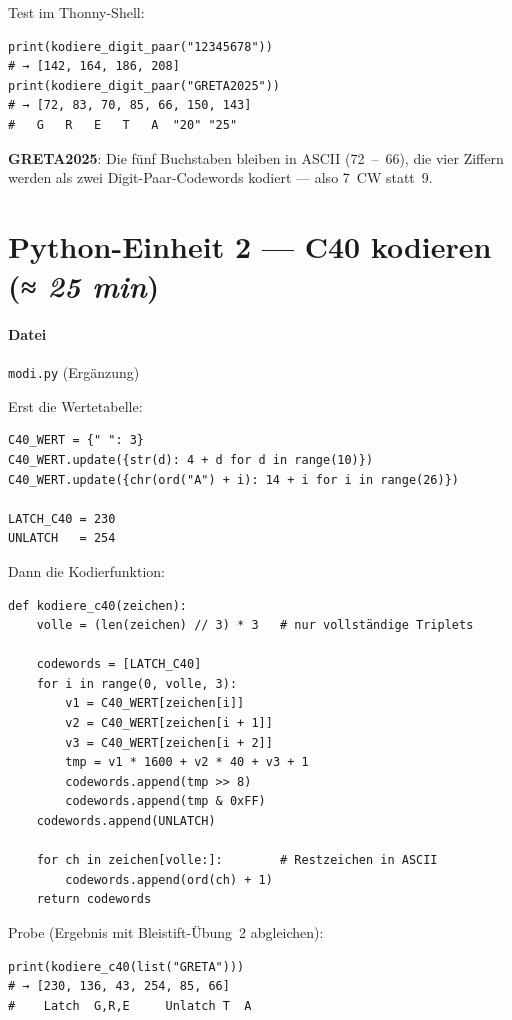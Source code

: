 Test im Thonny-Shell:

\begin{verbatim}
print(kodiere_digit_paar("12345678"))
# → [142, 164, 186, 208]
print(kodiere_digit_paar("GRETA2025"))
# → [72, 83, 70, 85, 66, 150, 143]
#   G   R   E   T   A  "20" "25"
\end{verbatim}

\textbf{GRETA2025}: Die fünf Buchstaben bleiben in ASCII (72~–~66),
die vier Ziffern werden als zwei Digit-Paar-Codewords kodiert — also
7~CW statt~9.

\section{Python-Einheit 2 — C40 kodieren \normalfont(\textit{≈ 25 min})}

\paragraph{Datei} \texttt{modi.py} (Ergänzung)

Erst die Wertetabelle:

\begin{verbatim}
C40_WERT = {" ": 3}
C40_WERT.update({str(d): 4 + d for d in range(10)})
C40_WERT.update({chr(ord("A") + i): 14 + i for i in range(26)})

LATCH_C40 = 230
UNLATCH   = 254
\end{verbatim}

Dann die Kodierfunktion:

\begin{verbatim}
def kodiere_c40(zeichen):
    volle = (len(zeichen) // 3) * 3   # nur vollständige Triplets

    codewords = [LATCH_C40]
    for i in range(0, volle, 3):
        v1 = C40_WERT[zeichen[i]]
        v2 = C40_WERT[zeichen[i + 1]]
        v3 = C40_WERT[zeichen[i + 2]]
        tmp = v1 * 1600 + v2 * 40 + v3 + 1
        codewords.append(tmp >> 8)
        codewords.append(tmp & 0xFF)
    codewords.append(UNLATCH)

    for ch in zeichen[volle:]:        # Restzeichen in ASCII
        codewords.append(ord(ch) + 1)
    return codewords
\end{verbatim}

Probe (Ergebnis mit Bleistift-Übung~2 abgleichen):

\begin{verbatim}
print(kodiere_c40(list("GRETA")))
# → [230, 136, 43, 254, 85, 66]
#    Latch  G,R,E     Unlatch T  A
\end{verbatim}

